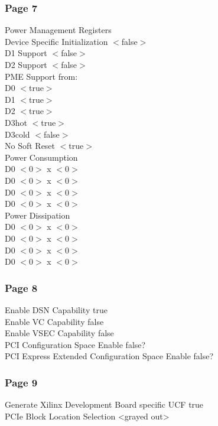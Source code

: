 \subsubsection{Page 7}
Power Management Registers \\
Device Specific Initialization $<$false$>$ \\
D1 Support $<$false$>$ \\
D2 Support $<$false$>$ \\
PME Support from: \\
D0 $<$true$>$ \\
D1 $<$true$>$ \\
D2 $<$true$>$ \\
D3hot $<$true$>$\\ 
D3cold $<$false$>$\\ 
No Soft Reset $<$true$>$  \\


Power Consumption \\
D0 $<$0$>$ x $<$0$>$ \\
D0 $<$0$>$ x $<$0$>$ \\
D0 $<$0$>$ x $<$0$>$ \\
D0 $<$0$>$ x $<$0$>$  \\
Power Dissipation \\
D0 $<$0$>$ x $<$0$>$ \\
D0 $<$0$>$ x $<$0$>$ \\
D0 $<$0$>$ x $<$0$>$ \\
D0 $<$0$>$ x $<$0$>$ \\

\subsubsection{Page 8}
Enable DSN Capability true \\
Enable VC Capability false \\
Enable VSEC Capability false \\
PCI Configuration Space Enable false? \\
PCI Express Extended Configuration Space Enable false?  \\

\subsubsection{Page 9}
Generate Xilinx Development Board specific UCF true \\
PCIe Block Location Selection <grayed out>  \\


